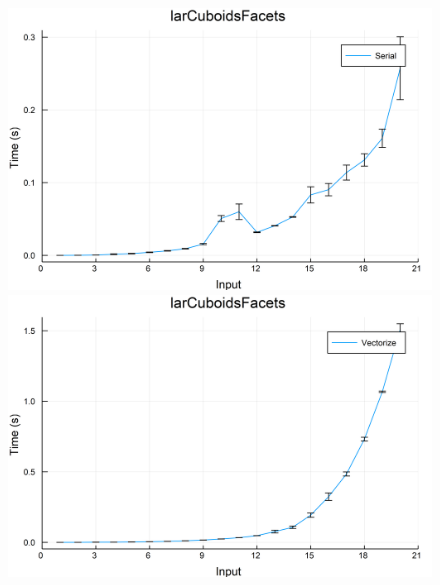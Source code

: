 \documentclass{article}
\begin{document}
\begin{figure}[h!]
\centering
\includegraphics[scale=0.06]{larCuboidsFacetsSer.png}
\includegraphics[scale=0.06]{larCuboidsFacetsVec.png}
\end{figure}
\end{document}

